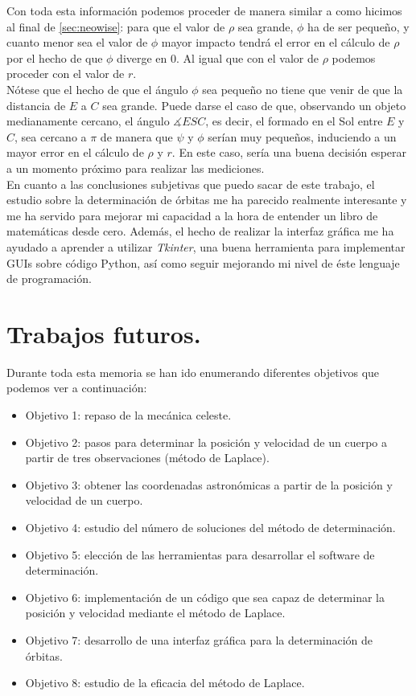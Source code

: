 Con toda esta información podemos proceder de manera similar a como hicimos al final de \ref{sec:neowise}: para que el valor de $\rho$ sea grande, $\phi$ ha de ser pequeño, y cuanto menor sea el valor de $\phi$ mayor impacto tendrá el error en el cálculo de $\rho$ por el hecho de que $\phi$ diverge en 0. Al igual que con el valor de $\rho$ podemos proceder con el valor de $r$.\\

Nótese que el hecho de que el ángulo $\phi$ sea pequeño no tiene que venir de que la distancia de $E$ a $C$ sea grande. Puede darse el caso de que, observando un objeto medianamente cercano, el ángulo $\measuredangle{ESC}$, es decir, el formado en el Sol entre $E$ y $C$, sea cercano a $\pi$ de manera que $\psi$ y $\phi$ serían muy pequeños, induciendo a un mayor error en el cálculo de $\rho$ y $r$. En este caso, sería una buena decisión esperar a un momento próximo para realizar las mediciones.\\

En cuanto a las conclusiones subjetivas que puedo sacar de este trabajo, el estudio sobre la determinación de órbitas me ha parecido realmente interesante y me ha servido para mejorar mi capacidad a la hora de entender un libro de matemáticas desde cero. Además, el hecho de realizar la interfaz gráfica me ha ayudado a aprender a utilizar \textit{Tkinter}, una buena herramienta para implementar GUIs sobre código Python, así como seguir mejorando mi nivel de éste lenguaje de programación.\\

\section{Trabajos futuros.}
Durante toda esta memoria se han ido enumerando diferentes objetivos que podemos ver a continuación:
\begin{itemize}
\item Objetivo 1: repaso de la mecánica celeste.
\item Objetivo 2: pasos para determinar la posición y velocidad de un cuerpo a partir de tres observaciones (método de Laplace).
\item Objetivo 3: obtener las coordenadas astronómicas a partir de la posición y velocidad de un cuerpo.
\item Objetivo 4: estudio del número de soluciones del método de determinación.
\item Objetivo 5: elección de las herramientas para desarrollar el software de determinación.
\item Objetivo 6: implementación de un código que sea capaz de determinar la posición y velocidad mediante el método de Laplace.
\item Objetivo 7: desarrollo de una interfaz gráfica para la determinación de órbitas.
\item Objetivo 8: estudio de la eficacia del método de Laplace.
\end{itemize}

